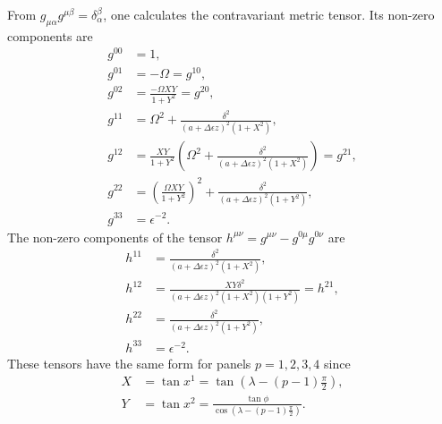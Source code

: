 \documentclass{article}
\begin{document}
From $g_{\mu \alpha}g^{\mu \beta}=\delta^\beta_\alpha$, one calculates the contravariant metric tensor. Its non-zero components are
\begin{align}
g^{00}&=1, \\
g^{01}&=-\Omega =g^{10}, \\
g^{02}&=\frac{-\Omega XY}{1+Y^2} = g^{20}, \\
g^{11}&=\Omega^2 + \frac{\delta^2}{(a+\Delta \epsilon z)^2(1+X^2)}, \\
g^{12}&=\frac{XY}{1+Y^2}\left(\Omega^2+\frac{\delta^2}{(a+\Delta \epsilon z)^2(1+X^2)} \right)=g^{21}, \\
g^{22}&=\left( \frac{\Omega XY}{1+Y^2} \right)^2 + \frac{\delta^2}{(a+\Delta \epsilon z)^2(1+Y^2)}, \\
g^{33}&=\epsilon^{-2}.
\end{align}
The non-zero components of the tensor $h^{\mu \nu}=g^{\mu \nu}-g^{0 \mu}g^{0 \nu}$ are
\begin{align}
h^{11}&=\frac{\delta^2}{(a+\Delta \epsilon z)^2(1+X^2)}, \\
h^{12}&=\frac{XY\delta^2}{(a+\Delta \epsilon z)^2(1+X^2)(1+Y^2)}=h^{21}, \\
h^{22}&=\frac{\delta^2}{(a+\Delta \epsilon z)^2(1+Y^2)}, \\
h^{33}&=\epsilon^{-2}.
\end{align}
These tensors have the same form for panels $p=1,2,3,4$ since
\begin{align}
X&=\tan x^1 = \tan \left( \lambda -(p-1)\frac{\pi}{2} \right), \\
Y&=\tan x^2 = \frac{\tan \phi}{\cos \left( \lambda -(p-1)\frac{\pi}{2}\right)}.
\end{align}
\end{document}
